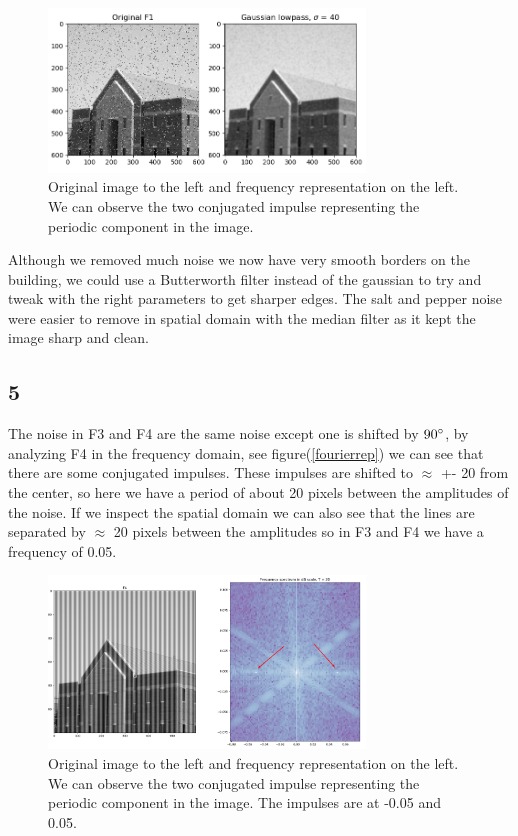 {    \begin{figure}[!htb]
        {\centering
            \includegraphics[width=0.75\textwidth]{task4pepper.png}
            \caption{Original image to the left and frequency representation on the left. We can observe the two conjugated impulse representing the periodic component in the image.}
            \label{task4pepper}
        \par}
        \end{figure}

Although we removed much noise we now have very smooth borders on the building, we could use a Butterworth filter instead of the gaussian to try and tweak with the right parameters to get sharper edges. The salt and pepper noise were easier to remove in spatial domain with the median filter as it kept the image sharp and clean.

\subsection{5}


The noise in F3 and F4 are the same noise except one is shifted by $90\degree$, by analyzing F4 in the frequency domain, see figure(\ref{fourierrep}) we can see that there are some conjugated impulses. These impulses are shifted to $\approx$ +- 20 from the center, so here we have a period of about 20 pixels between the amplitudes of the noise. If we inspect the spatial domain we can also see that the lines are separated by $\approx$ 20 pixels between the amplitudes so in F3 and F4 we have a frequency of 0.05.

\begin{figure}[!htb]
    {\centering
        \includegraphics[width=0.75\textwidth]{simulatedperiod.png}
        \caption{Original image to the left and frequency representation on the left. We can observe the two conjugated impulse representing the periodic component in the image. The impulses are at -0.05 and 0.05.}
        \label{simulatedperiod}
    \par}
    \end{figure}




}
